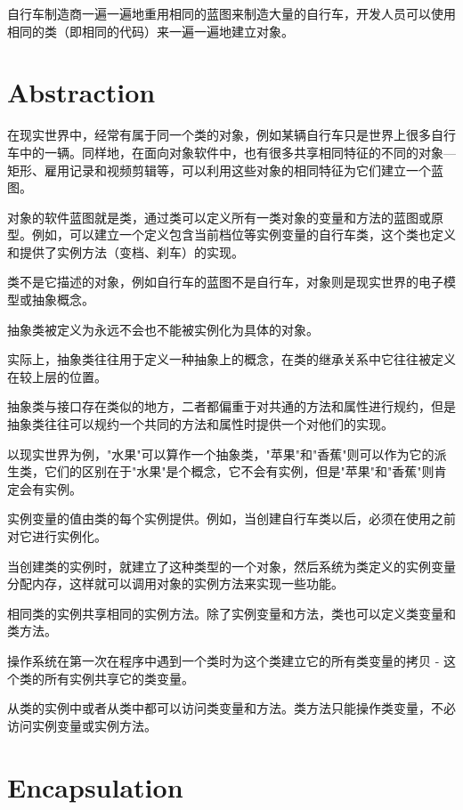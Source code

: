 自行车制造商一遍一遍地重用相同的蓝图来制造大量的自行车，开发人员可以使用相同的类（即相同的代码）来一遍一遍地建立对象。



\section{Abstraction}


在现实世界中，经常有属于同一个类的对象，例如某辆自行车只是世界上很多自行车中的一辆。同样地，在面向对象软件中，也有很多共享相同特征的不同的对象—矩形、雇用记录和视频剪辑等，可以利用这些对象的相同特征为它们建立一个蓝图。

对象的软件蓝图就是类，通过类可以定义所有一类对象的变量和方法的蓝图或原型。例如，可以建立一个定义包含当前档位等实例变量的自行车类，这个类也定义和提供了实例方法（变档、刹车）的实现。

\begin{compactitem}
\item 类不是它描述的对象，例如自行车的蓝图不是自行车，对象则是现实世界的电子模型或抽象概念。
\item 抽象类被定义为永远不会也不能被实例化为具体的对象。
\end{compactitem}

实际上，抽象类往往用于定义一种抽象上的概念，在类的继承关系中它往往被定义在较上层的位置。

抽象类与接口存在类似的地方，二者都偏重于对共通的方法和属性进行规约，但是抽象类往往可以规约一个共同的方法和属性时提供一个对他们的实现。

以现实世界为例，"水果"可以算作一个抽象类，"苹果"和"香蕉"则可以作为它的派生类，它们的区别在于"水果"是个概念，它不会有实例，但是"苹果"和"香蕉"则肯定会有实例。

实例变量的值由类的每个实例提供。例如，当创建自行车类以后，必须在使用之前对它进行实例化。



当创建类的实例时，就建立了这种类型的一个对象，然后系统为类定义的实例变量分配内存，这样就可以调用对象的实例方法来实现一些功能。

相同类的实例共享相同的实例方法。除了实例变量和方法，类也可以定义类变量和类方法。

操作系统在第一次在程序中遇到一个类时为这个类建立它的所有类变量的拷贝 - 这个类的所有实例共享它的类变量。


从类的实例中或者从类中都可以访问类变量和方法。类方法只能操作类变量，不必访问实例变量或实例方法。



\section{Encapsulation}

